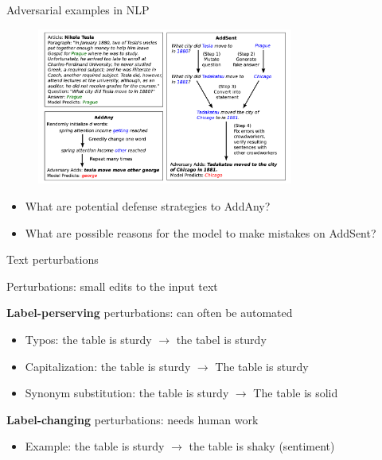 \documentclass[usenames,dvipsnames,notes,11pt,aspectratio=169,hyperref={colorlinks=true, linkcolor=blue}]{beamer}
\begin{document}
\begin{frame}
    {Adversarial examples in NLP}

    \begin{figure}
    \includegraphics[width=0.75\textwidth]{figures/advqa-approach}
    \end{figure}
    \vspace{-1em}
    \begin{itemize}
        \item What are potential defense strategies to AddAny?
        \item What are possible reasons for the model to make mistakes on AddSent?
    \end{itemize}
\end{frame}

\begin{frame}
    {Text perturbations}

    Perturbations: small edits to the input text

    \textbf{Label-perserving} perturbations: can often be automated\\
    \begin{itemize}
        \item Typos: the table is sturdy $\rightarrow$ the tabel is sturdy
        \item Capitalization: the table is sturdy $\rightarrow$ The table is sturdy
        \item Synonym substitution: the table is sturdy $\rightarrow$ The table is solid 
    \end{itemize}
    \pause

    \textbf{Label-changing} perturbations: needs human work\\
    \begin{itemize}
        \item Example:   the table is sturdy $\rightarrow$ the table is shaky (sentiment) 
    \end{itemize}
\end{frame}
\end{document}

